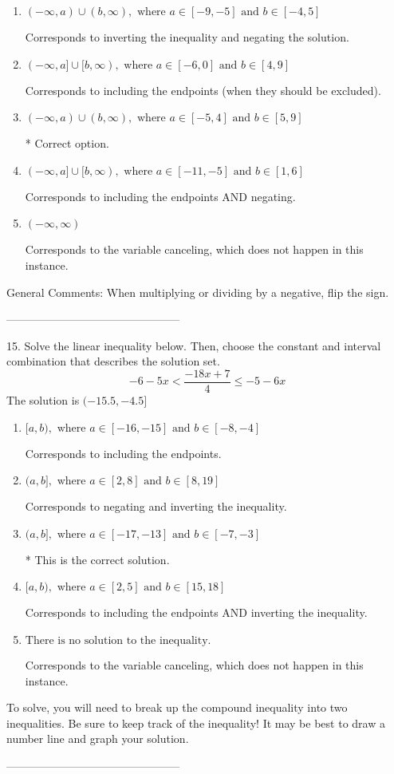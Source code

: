 \documentclass{article}[10pt]
\begin{document}
\begin{enumerate}[label=\Alph*.] 
\item $ (-\infty, a) \cup (b, \infty), \text{ where } a \in [-9, -5] \text{ and } b \in [-4, 5] $ 

 Corresponds to inverting the inequality and negating the solution. 
\item $ (-\infty, a] \cup [b, \infty), \text{ where } a \in [-6, 0] \text{ and } b \in [4, 9] $ 

 Corresponds to including the endpoints (when they should be excluded). 
\item $ (-\infty, a) \cup (b, \infty), \text{ where } a \in [-5, 4] \text{ and } b \in [5, 9] $ 

  * Correct option. 
\item $ (-\infty, a] \cup [b, \infty), \text{ where } a \in [-11, -5] \text{ and } b \in [1, 6] $ 

 Corresponds to including the endpoints AND negating. 
\item $ (-\infty, \infty) $ 

 Corresponds to the variable canceling, which does not happen in this instance. 
\end{enumerate} 
 
General Comments: When multiplying or dividing by a negative, flip the sign.

-----------------------------------------------

15. Solve the linear inequality below. Then, choose the constant and interval combination that describes the solution set.
$$ -6 - 5 x < \frac{-18 x + 7}{4} \leq -5 - 6 x $$ 
The solution is $ (-15.5, -4.5] $ 

\begin{enumerate}[label=\Alph*.] 
\item $ [a, b), \text{ where } a \in [-16, -15] \text{ and } b \in [-8, -4] $ 

 Corresponds to including the endpoints. 
\item $ (a, b], \text{ where } a \in [2, 8] \text{ and } b \in [8, 19] $ 

 Corresponds to negating and inverting the inequality. 
\item $ (a, b], \text{ where } a \in [-17, -13] \text{ and } b \in [-7, -3] $ 

  * This is the correct solution. 
\item $ [a, b), \text{ where } a \in [2, 5] \text{ and } b \in [15, 18] $ 

 Corresponds to including the endpoints AND inverting the inequality. 
\item $ \text{There is no solution to the inequality.} $ 

 Corresponds to the variable canceling, which does not happen in this instance. 
\end{enumerate} 
 
To solve, you will need to break up the compound inequality into two inequalities. Be sure to keep track of the inequality! It may be best to draw a number line and graph your solution.

-----------------------------------------------
\end{document}
